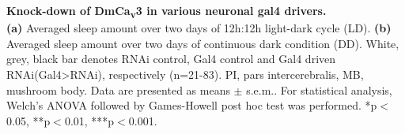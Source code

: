 \label{fig:S4}
\textbf{Knock-down of DmCa\textsubscript{v}3 in various neuronal gal4 drivers.}
\\
\textbf {(a)} Averaged sleep amount over two days of 12h:12h light-dark cycle (LD).
\textbf {(b)} Averaged sleep amount over two days of continuous dark condition (DD).
White, grey, black bar denotes RNAi control, Gal4 control and Gal4 driven RNAi(Gal4\textgreater{}RNAi), respectively (n=21-83).
PI, pars intercerebralis, MB, mushroom body. 
Data are presented as means $\pm$ s.e.m..
For statistical analysis, Welch's ANOVA followed by Games-Howell post hoc test was performed.
*p$<$0.05, **p$<$0.01, ***p$<$0.001.
  
  
  
  